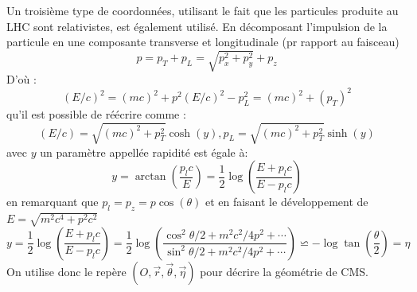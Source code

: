 Un troisième type de coordonnées, utilisant le fait que les particules produite au LHC sont relativistes, est également utilisé.
En décomposant l'impulsion de la particule en une composante transverse et longitudinale (pr rapport au faisceau)
\begin{equation}
p=p_{T}+p_{L}=\sqrt{p_{x}^{2}+p_{y}^{2}}+p_{z}
\end{equation}
D'où :
\begin{equation}
( E/c)^{2}=(mc)^{2}+p^{2} (E/c)^{2}-p_{L}^{2}=(mc)^{2}+(p_{T})^{2}
\end{equation}
qu'il est possible de réécrire comme :
\begin{equation}
\left( E/c \right)=\sqrt{\left( mc \right)^{2}+p_{T}^{2}}\cosh(y), p_{L}=\sqrt{\left( mc \right)^{2}+p_{T}^{2}}\sinh(y)
\end{equation}
avec $y$ un paramètre appellée rapidité est égale à:
\begin{equation}
y=\arctan\left(\frac{p_{l}c}{E}\right)=\frac{1}{2}\log\left(\frac{E+p_{l}c}{E-p_{l}c}\right)
\end{equation}
en remarquant que $p_{l}=p_{z}=p\cos(\theta)$ et en faisant le développement de $E=\sqrt{m^{2}c^{4}+p^{2}c^{2}}$
\begin{equation}
y=\frac{1}{2} \log\left(\frac{E+p_{l}c}{E-p_{l}c}\right)=\frac{1}{2}\log\left(\frac{\cos^2 \theta/2+m^{2}c^{2}/4p^{2}+\cdots}{\sin^2 \theta/2+m^{2}c^{2}/4p^{2}+\cdots}\right)\backsimeq-\log\tan\left(\frac{\theta}{2}\right)=\eta
\end{equation}
On utilise donc le repère $\left(O,\vec{r},\vec{\theta},\vec{\eta}\right)$ pour décrire la géométrie de CMS.

